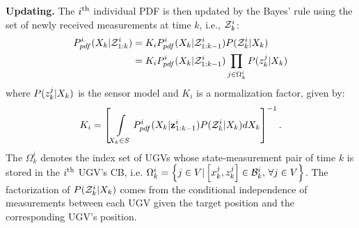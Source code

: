 	\textbf{Updating.}
	The $i^\text{th}$ individual PDF is then updated by the Bayes' rule using the set of newly received measurements at time $k$, i.e., $\mathcal{Z}^i_k$:
		\small\begin{align}\label{eqn:bayes_upd}
			\begin{split}
				P^i_{pdf}(X_k|\mathcal{Z}^i_{1:k})
				&= K_iP^i_{pdf}(X_k|\mathcal{Z}^i_{1:k-1})P(\mathcal{Z}^i_k|X_k)\\
				&=K_iP^i_{pdf}(X_k|\mathcal{Z}^i_{1:k-1})\prod\limits_{j\in\Omega^i_k}P(z^j_k|X_{k})
			\end{split}
		\end{align}\normalsize
	where $P(z^j_k|X_k)$ is the sensor model and $K_i$ is a normalization factor, given by:
	\small\begin{align*}
	K_i=\left[\int\limits_{X_k\in S} P^i_{pdf}(X_k|\mathbf{z}^i_{1:k-1})P(\mathcal{Z}^i_k|X_k)dX_k\right]^{-1}.
	\end{align*}\normalsize
	The $\Omega^i_k$ denotes the index set of UGVs whose state-measurement pair of time $k$ is stored in the $i^\text{th}$ UGV's CB, i.e. $\Omega^i_k=\left\lbrace j\in V | \left[x^j_k,z^j_k\right]\in \mathcal{B}^i_k,\, \forall j\in V\right\rbrace$.
	The factorization of $P(\mathcal{Z}^i_k|X_k)$ comes from the conditional independence of measurements between each UGV given the target position and the corresponding UGV's position.	
	
